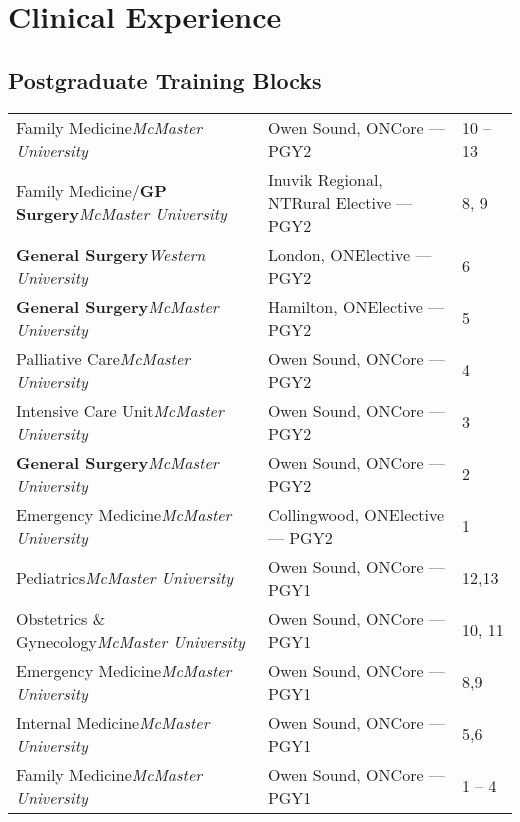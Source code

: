 \documentclass[a4paper,10pt,oneside,onecolumn,draft]{article} %
\begin{document}
\section*{Clinical Experience}
\subsection*{Postgraduate Training \hfill \normalfont \small \bfseries Blocks \hspace{26pt}}
\begin{supertabular*}{1\textwidth}{F@{}G@{\SubVRule}H}
  {Family Medicine}\hfill{\slshape McMaster University\/}&{Owen Sound, ON}\hfill{Core --- PGY2}&10 -- 13\\
  {Family Medicine/\bfseries GP Surgery}\hfill{\slshape McMaster University\/}&{Inuvik Regional, NT}\hfill{Rural Elective --- PGY2}&8, 9\\
  {\bfseries General Surgery}\hfill{\slshape Western University\/}&{London, ON}\hfill{Elective --- PGY2}&6\\
  {\bfseries General Surgery}\hfill{\slshape McMaster University\/}&{Hamilton, ON}\hfill{Elective --- PGY2}&5\\
  {Palliative Care}\hfill{\slshape McMaster University\/}&{Owen Sound, ON}\hfill{Core --- PGY2}&4\\
  {Intensive Care Unit}\hfill{\slshape McMaster University\/}&{Owen Sound, ON}\hfill{Core --- PGY2}&3\\
  {\bfseries General Surgery}\hfill{\slshape McMaster University\/}&{Owen Sound, ON}\hfill{Core --- PGY2}&2\\
  {Emergency Medicine}\hfill{\slshape McMaster University\/}&{Collingwood, ON}\hfill{Elective --- PGY2}&1\\
  {Pediatrics}\hfill{\slshape McMaster University\/}&{Owen Sound, ON}\hfill{Core --- PGY1}&12,13\\
  {Obstetrics \& Gynecology}\hfill{\slshape McMaster University\/}&{Owen Sound, ON}\hfill{Core --- PGY1}&10, 11\\
  {Emergency Medicine}\hfill{\slshape McMaster University\/}&{Owen Sound, ON}\hfill{Core --- PGY1}&8,9\\
  {Internal Medicine}\hfill{\slshape McMaster University\/}&{Owen Sound, ON}\hfill{Core --- PGY1}&5,6\\
  {Family Medicine}\hfill{\slshape McMaster University\/}&{Owen Sound, ON}\hfill{Core --- PGY1}&1 -- 4\\
\end{supertabular*}
\end{document}
